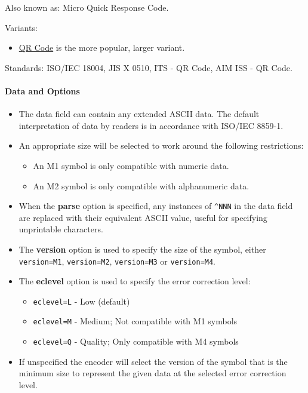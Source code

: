 Also known as: Micro Quick Response Code.

Variants:

\begin{itemize}
\tightlist
\item
  \protect\hyperlink{qr-code}{QR Code} is the more popular, larger
  variant.
\end{itemize}

Standards: ISO/IEC 18004, JIS X 0510, ITS - QR Code, AIM ISS - QR Code.

\hypertarget{data-and-options-17}{%
\paragraph{Data and Options}\label{data-and-options-17}}

\begin{itemize}
\tightlist
\item
  The data field can contain any extended ASCII data. The default
  interpretation of data by readers is in accordance with ISO/IEC
  8859-1.
\item
  An appropriate size will be selected to work around the following
  restrictions:

  \begin{itemize}
  \tightlist
  \item
    An M1 symbol is only compatible with numeric data.
  \item
    An M2 symbol is only compatible with alphanumeric data.
  \end{itemize}
\item
  When the \textbf{parse} option is specified, any instances of
  \texttt{\^{}NNN} in the data field are replaced with their equivalent
  ASCII value, useful for specifying unprintable characters.
\item
  The \textbf{version} option is used to specify the size of the symbol,
  either \texttt{version=M1}, \texttt{version=M2}, \texttt{version=M3}
  or \texttt{version=M4}.
\item
  The \textbf{eclevel} option is used to specify the error correction
  level:

  \begin{itemize}
  \tightlist
  \item
    \texttt{eclevel=L} - Low (default)
  \item
    \texttt{eclevel=M} - Medium; Not compatible with M1 symbols
  \item
    \texttt{eclevel=Q} - Quality; Only compatible with M4 symbols
  \end{itemize}
\item
  If unspecified the encoder will select the version of the symbol that
  is the minimum size to represent the given data at the selected error
  correction level.
\end{itemize}

